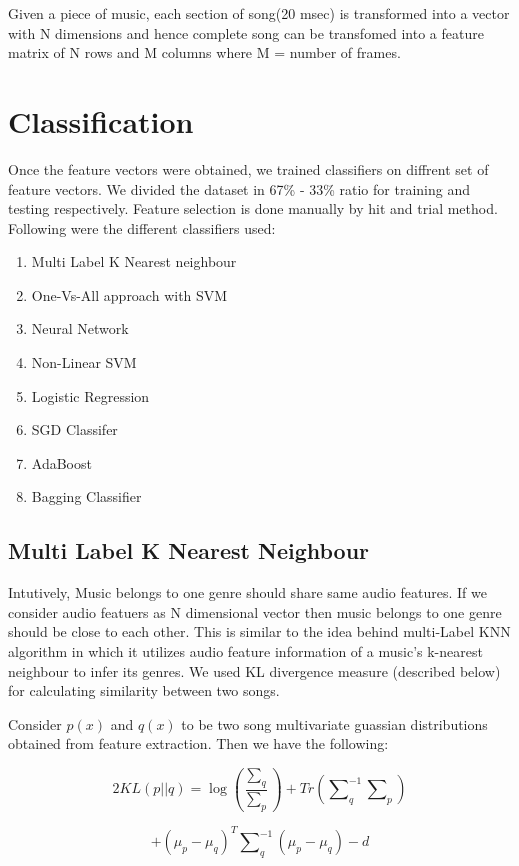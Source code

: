 \documentclass[conference]{IEEEtran}
\begin{document}
Given a piece of music, each section of song(20 msec) is transformed into a vector with N dimensions and hence complete song can be transfomed into a feature matrix of N rows
and M columns where M = number of frames.

\section{Classification}
Once the feature vectors were obtained, we trained classifiers on diffrent set of feature vectors. We divided the dataset in 67\% - 33\% ratio for training and testing respectively. Feature selection is done manually by hit and trial method. Following were the different classifiers used:

\begin{enumerate}
  \item Multi Label K Nearest neighbour
  \item One-Vs-All approach with SVM
  \item Neural Network
  \item Non-Linear SVM
  \item Logistic Regression
  \item SGD Classifer
  \item AdaBoost
  \item Bagging Classifier
\end{enumerate}


\subsection{Multi Label K Nearest Neighbour}
\label{sub:Multi Label K Nearest Neighbour}

Intutively, Music belongs to one genre should share same audio features. If we consider audio featuers as N dimensional vector then music belongs to one genre should be close to each other. This is similar to the idea behind multi-Label KNN algorithm in which it utilizes audio feature information of a music's k-nearest neighbour to infer its genres. We used KL divergence measure (described below) for calculating similarity between two songs.

Consider $ p(x) $ and $ q(x) $ to be two song multivariate guassian distributions obtained from feature extraction. Then we have the following:

$$ 2KL(p||q) = \log{\left(\frac{\sum\nolimits_q}{\sum\nolimits_p}\right)} + Tr\left(\sum\nolimits_q^{-1}\sum\nolimits_p\right) $$

$$    + {\left(\mu_p - \mu_q\right)}^{T}\sum\nolimits_q^{-1}(\mu_p - \mu_q) - d $$
\end{document}
